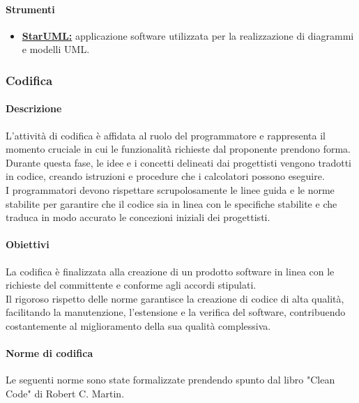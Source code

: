 \paragraph{Strumenti}
\begin{itemize}
    \item \href{https://staruml.io/}{\textbf{StarUML:}} applicazione software utilizzata per la realizzazione di diagrammi e modelli UML.
\end{itemize}

\subsubsection{Codifica}
\paragraph{Descrizione}
L'attività di codifica è affidata al ruolo del programmatore e rappresenta il momento cruciale in cui le funzionalità richieste dal proponente prendono forma. \\
Durante questa fase, le idee e i concetti delineati dai progettisti vengono tradotti in codice, creando istruzioni e procedure che i calcolatori possono eseguire. \\
I programmatori devono rispettare scrupolosamente le linee guida e le norme stabilite per garantire che il codice sia in linea con le specifiche stabilite e che traduca in modo accurato le concezioni iniziali dei progettisti.
\paragraph{Obiettivi}
La codifica è finalizzata alla creazione di un prodotto software in linea con le richieste del committente e conforme agli accordi stipulati.\\
Il rigoroso rispetto delle norme garantisce la creazione di codice di alta qualità, facilitando la manutenzione, l'estensione e la verifica del software, contribuendo costantemente al miglioramento della sua qualità complessiva.
\paragraph{Norme di codifica}
Le seguenti norme sono state formalizzate prendendo spunto dal libro "Clean Code" di Robert C. Martin.

